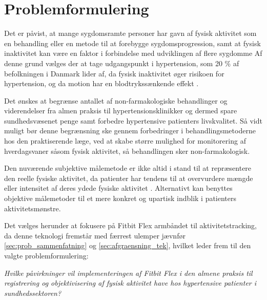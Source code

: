 \section{Problemformulering}


Det er påvist, at mange sygdomsramte personer har gavn af fysisk aktivitet som en behandling eller en metode til at forebygge sygdomsprogression, samt at fysisk inaktivitet kan være en faktor i forbindelse med udviklingen af flere sygdomme \citep{motionsraad2007,pedersen2011}
Af denne grund vælges der at tage udgangspunkt i hypertension, som 20 \% af befolkningen i Danmark lider af, da fysisk inaktivitet øger risikoen for hypertension, og da motion har en blodtrykssænkende effekt \citep{pedersen2011,olsen2015}. 

Det ønskes at begrænse antallet af non-farmakologiske behandlinger og viderendelser fra almen praksis til hypertensionsklinikker og dermed spare sundhedsvæsenet penge samt forbedre hypertensive patienters livskvalitet. Så vidt muligt bør denne begrænsning ske gennem forbedringer i behandlingsmetoderne hos den praktiserende læge, ved at skabe større mulighed for monitorering af hverdagsvaner såsom fysisk aktivitet, så behandlingen sker non-farmakologisk.

Den nuværende subjektive målemetode er ikke altid i stand til at repræsentere den reelle fysiske aktivitet, da patienter har tendens til at overvurdere mængde eller intensitet af deres ydede fysiske aktivitet \citep{motionsraad2007,pedersen2011,adamo2009}. Alternativt kan benyttes objektive målemetoder til et mere konkret og upartisk indblik i patienters aktivitetsmønstre. 

Det vælges herunder at fokusere på Fitbit Flex armbåndet til aktivitetstracking, da denne teknologi fremstår med færrest ulemper jævnfør \autoref{sec:prob_sammenfatning} og \autoref{sec:afgraensning_tek}, hvilket leder frem til den valgte problemformulering: 


\begin{center}
\textit{Hvilke påvirkninger vil implementeringen af Fitbit Flex i den almene praksis til registrering og objektivisering af fysisk aktivitet have hos hypertensive patienter i sundhedssektoren?}
\end{center}